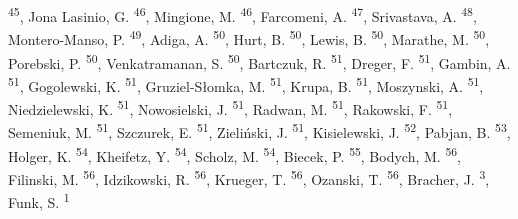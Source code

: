 \documentclass[
]{article}
\begin{document}
\textsuperscript{45}, Jona Lasinio, G. \textsuperscript{46}, Mingione, M. \textsuperscript{46}, Farcomeni, A. \textsuperscript{47}, Srivastava, A. \textsuperscript{48}, Montero-Manso, P. \textsuperscript{49}, Adiga, A. \textsuperscript{50}, Hurt, B. \textsuperscript{50}, Lewis, B. \textsuperscript{50}, Marathe, M. \textsuperscript{50}, Porebski, P. \textsuperscript{50}, Venkatramanan, S. \textsuperscript{50}, Bartczuk, R. \textsuperscript{51}, Dreger, F. \textsuperscript{51}, Gambin, A. \textsuperscript{51}, Gogolewski, K. \textsuperscript{51}, Gruziel-Słomka, M. \textsuperscript{51}, Krupa, B. \textsuperscript{51}, Moszynski, A. \textsuperscript{51}, Niedzielewski, K. \textsuperscript{51}, Nowosielski, J. \textsuperscript{51}, Radwan, M. \textsuperscript{51}, Rakowski, F. \textsuperscript{51}, Semeniuk, M. \textsuperscript{51}, Szczurek, E. \textsuperscript{51}, Zieliński, J. \textsuperscript{51}, Kisielewski, J. \textsuperscript{52}, Pabjan, B. \textsuperscript{53}, Holger, K. \textsuperscript{54}, Kheifetz, Y. \textsuperscript{54}, Scholz, M. \textsuperscript{54}, Biecek, P. \textsuperscript{55}, Bodych, M. \textsuperscript{56}, Filinski, M. \textsuperscript{56}, Idzikowski, R. \textsuperscript{56}, Krueger, T. \textsuperscript{56}, Ozanski, T. \textsuperscript{56}, Bracher, J. \textsuperscript{3}, Funk, S. \textsuperscript{1}
\end{document}
